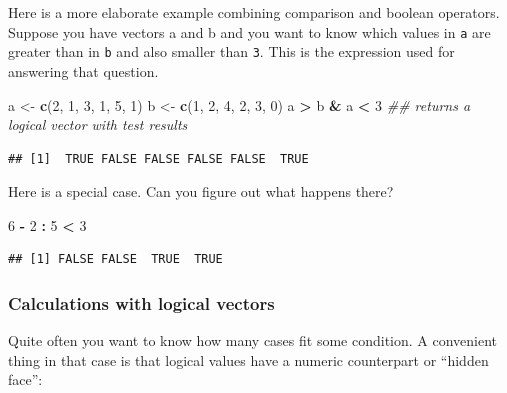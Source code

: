 \documentclass[]{book}
\newenvironment{Shaded}{\begin{snugshade}}{\end{snugshade}}
\newcommand{\CommentTok}[1]{\textcolor[rgb]{0.56,0.35,0.01}{\textit{#1}}}
\newcommand{\DecValTok}[1]{\textcolor[rgb]{0.00,0.00,0.81}{#1}}
\newcommand{\KeywordTok}[1]{\textcolor[rgb]{0.13,0.29,0.53}{\textbf{#1}}}
\newcommand{\NormalTok}[1]{#1}
\newcommand{\OperatorTok}[1]{\textcolor[rgb]{0.81,0.36,0.00}{\textbf{#1}}}
\newcommand{\StringTok}[1]{\textcolor[rgb]{0.31,0.60,0.02}{#1}}
\begin{document}
Here is a more elaborate example combining comparison and boolean operators.
Suppose you have vectors a and b and you want to know which values in \texttt{a} are greater than in \texttt{b} and also smaller than \texttt{3}. This is the expression used for answering that question.

\begin{Shaded}
\begin{Highlighting}[]
\NormalTok{a <-}\StringTok{ }\KeywordTok{c}\NormalTok{(}\DecValTok{2}\NormalTok{, }\DecValTok{1}\NormalTok{, }\DecValTok{3}\NormalTok{, }\DecValTok{1}\NormalTok{, }\DecValTok{5}\NormalTok{, }\DecValTok{1}\NormalTok{)}
\NormalTok{b <-}\StringTok{ }\KeywordTok{c}\NormalTok{(}\DecValTok{1}\NormalTok{, }\DecValTok{2}\NormalTok{, }\DecValTok{4}\NormalTok{, }\DecValTok{2}\NormalTok{, }\DecValTok{3}\NormalTok{, }\DecValTok{0}\NormalTok{)}
\NormalTok{a }\OperatorTok{>}\StringTok{ }\NormalTok{b }\OperatorTok{&}\StringTok{ }\NormalTok{a }\OperatorTok{<}\StringTok{ }\DecValTok{3} \CommentTok{## returns a logical vector with test results}
\end{Highlighting}
\end{Shaded}

\begin{verbatim}
## [1]  TRUE FALSE FALSE FALSE FALSE  TRUE
\end{verbatim}

Here is a special case. Can you figure out what happens there?

\begin{Shaded}
\begin{Highlighting}[]
\DecValTok{6} \OperatorTok{-}\StringTok{ }\DecValTok{2} \OperatorTok{:}\StringTok{ }\DecValTok{5} \OperatorTok{<}\StringTok{ }\DecValTok{3}
\end{Highlighting}
\end{Shaded}

\begin{verbatim}
## [1] FALSE FALSE  TRUE  TRUE
\end{verbatim}

\hypertarget{calculations-with-logical-vectors}{%
\subsubsection*{Calculations with logical vectors}\label{calculations-with-logical-vectors}}

Quite often you want to know how many cases fit some condition. A convenient thing in that case is that logical values have a numeric counterpart or ``hidden face'':
\end{document}
